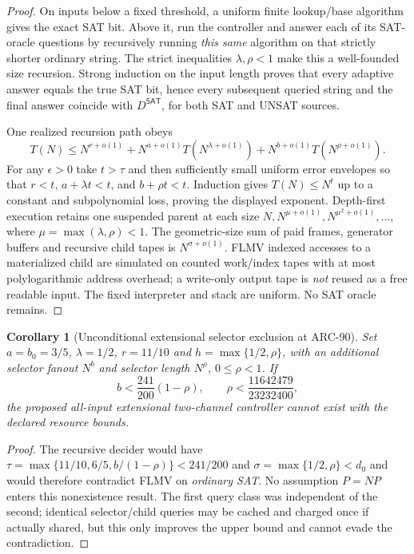 \documentclass[11pt]{article}
\newtheorem{corollary}[theorem]{Corollary}
\newcommand{\SAT}{\mathsf{SAT}}
\begin{document}
\begin{proof}
On inputs below a fixed threshold, a uniform finite lookup/base algorithm gives the exact SAT bit. Above it, run the controller and answer each of its SAT-oracle questions by recursively running \emph{this same} algorithm on that strictly shorter ordinary string. The strict inequalities $\lambda,\rho<1$ make this a well-founded size recursion. Strong induction on the input length proves that every adaptive answer equals the true SAT bit, hence every subsequent queried string and the final answer coincide with $D^{\SAT}$, for both SAT and UNSAT sources.

One realized recursion path obeys
\[
T(N)\le N^{r+o(1)}+N^{a+o(1)}T(N^{\lambda+o(1)})
                     +N^{b+o(1)}T(N^{\rho+o(1)}).
\]
For any $\epsilon>0$ take $t>\tau$ and then sufficiently small uniform error envelopes so that $r<t$, $a+\lambda t<t$, and $b+\rho t<t$. Induction gives $T(N)\le N^{t}$ up to a constant and subpolynomial loss, proving the displayed exponent. Depth-first execution retains one suspended parent at each size $N,N^{\mu+o(1)},N^{\mu^2+o(1)},\ldots$, where $\mu=\max(\lambda,\rho)<1$. The geometric-size sum of paid frames, generator buffers and recursive child tapes is $N^{\sigma+o(1)}$. FLMV indexed accesses to a materialized child are simulated on counted work/index tapes with at most polylogarithmic address overhead; a write-only output tape is \emph{not} reused as a free readable input. The fixed interpreter and stack are uniform. No SAT oracle remains.
\end{proof}
\begin{corollary}[Unconditional extensional selector exclusion at ARC-90]
Set $a=b_0=3/5$, $\lambda=1/2$, $r=11/10$ and $h=\max\{1/2,\rho\}$, with an additional selector fanout $N^b$ and selector length $N^\rho$, $0\le\rho<1$. If
\[
\boxed{\quad b<\frac{241}{200}(1-\rho),\qquad
\rho<\frac{11642479}{23232400},\quad}
\]
the proposed all-input extensional two-channel controller cannot exist with the declared resource bounds.
\end{corollary}
\begin{proof}
The recursive decider would have
$\tau=\max\{11/10,6/5,b/(1-\rho)\}<241/200$
and $\sigma=\max\{1/2,\rho\}<d_0$ and would therefore contradict FLMV on \emph{ordinary SAT}. No assumption $P=NP$ enters this nonexistence result. The first query class was independent of the second; identical selector/child queries may be cached and charged once if actually shared, but this only improves the upper bound and cannot evade the contradiction.
\end{proof}
\end{document}
